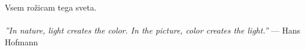 \thispagestyle{empty}\mbox{}{\textheight}\mbox{}\hfill\begin{minipage}{0.55\textwidth}%

Vsem rožicam tega sveta.\\\\
\textit{''In nature, light creates the color. In the picture, color creates the light.''}
\flushright --- Hans Hofmann
\normalfont\end{minipage}